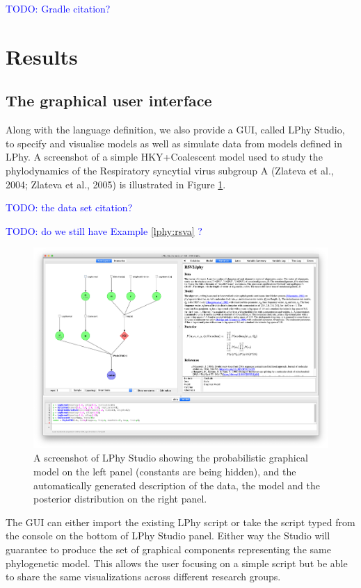 \documentclass[10pt,letterpaper,table]{article}
\begin{document}
{\textcolor{blue}{TODO: Gradle citation?}


\section{Results}

\subsection{The graphical user interface}

Along with the language definition, we also provide a GUI, called LPhy Studio, to specify and visualise models as well as simulate data from models defined in LPhy. A screenshot of a simple HKY+Coalescent model used to study the phylodynamics of the Respiratory syncytial virus subgroup A (Zlateva et al., 2004; Zlateva et al., 2005) is illustrated in Figure \ref{fig:lphystudio}. 

\textcolor{blue}{TODO: the data set citation?}

\textcolor{blue}{TODO: do we still have Example \ref{lphy:rsva} ?}

\begin{figure}
  \includegraphics[width=\textwidth]{figs/lphystudio_screenshot.png}
  \caption{A screenshot of LPhy Studio showing the probabilistic graphical model 
  on the left panel (constants are being hidden), and the automatically generated description of the data, the model and the posterior distribution on the right panel.} 
  \label{fig:lphystudio}
\end{figure}

The GUI can either import the existing LPhy script or take the script typed from the console on the bottom of LPhy Studio panel. Either way the Studio will guarantee to produce the set of graphical components representing the same phylogenetic model. 
This allows the user focusing on a simple script but be able to share the same visualizations across different research groups.  

}
\end{document}

